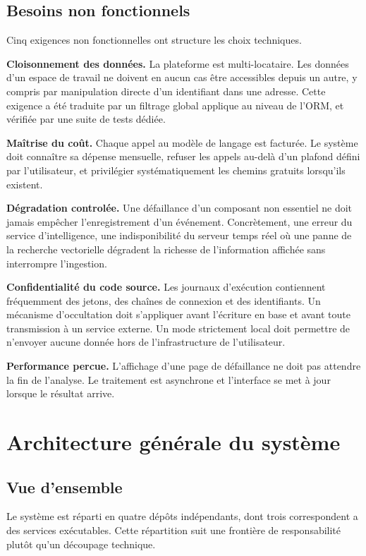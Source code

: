 \documentclass[12pt,a4paper,oneside]{report}
\begin{document}
\subsection{Besoins non fonctionnels}

Cinq exigences non fonctionnelles ont structure les choix techniques.

\textbf{Cloisonnement des données.} La plateforme est multi-locataire. Les
données d'un espace de travail ne doivent en aucun cas être accessibles depuis un
autre, y compris par manipulation directe d'un identifiant dans une adresse. Cette
exigence a été traduite par un filtrage global applique au niveau de l'ORM, et
vérifiée par une suite de tests dédiée.

\textbf{Maîtrise du coût.} Chaque appel au modèle de langage est facturée. Le
système doit connaître sa dépense mensuelle, refuser les appels au-delà d'un
plafond défini par l'utilisateur, et privilégier systématiquement les chemins
gratuits lorsqu'ils existent.

\textbf{Dégradation controlée.} Une défaillance d'un composant non essentiel ne
doit jamais empêcher l'enregistrement d'un événement. Concrètement, une erreur du
service d'intelligence, une indisponibilité du serveur temps réel où une panne de
la recherche vectorielle dégradent la richesse de l'information affichée sans
interrompre l'ingestion.

\textbf{Confidentialité du code source.} Les journaux d'exécution contiennent
fréquemment des jetons, des chaînes de connexion et des identifiants. Un
mécanisme d'occultation doit s'appliquer avant l'écriture en base et avant toute
transmission à un service externe. Un mode strictement local doit permettre de
n'envoyer aucune donnée hors de l'infrastructure de l'utilisateur.

\textbf{Performance percue.} L'affichage d'une page de défaillance ne doit pas
attendre la fin de l'analyse. Le traitement est asynchrone et l'interface se met
à jour lorsque le résultat arrive.

\section{Architecture générale du système}

\subsection{Vue d'ensemble}

Le système est réparti en quatre dépôts indépendants, dont trois correspondent a
des services exécutables. Cette répartition suit une frontière de responsabilité
plutôt qu'un découpage technique.
\end{document}

